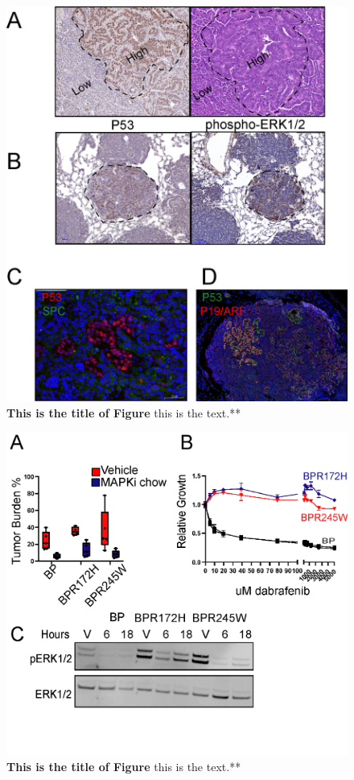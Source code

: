 \begin{figure}
\hypertarget{fig:04}{%
\centering
\includegraphics[width=1\textwidth,height=\textheight]{images/p53_5.png}
\caption{\textbf{This is the title of Figure} this is the text.**}\label{fig:04}
}
\end{figure}

\begin{figure}
\hypertarget{fig:04}{%
\centering
\includegraphics[width=1\textwidth,height=\textheight]{images/p536.png}
\caption{\textbf{This is the title of Figure} this is the text.**}\label{fig:04}
}
\end{figure}

